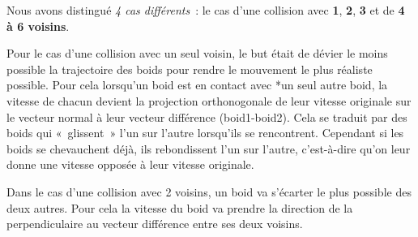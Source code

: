 \documentclass[
]{article}
\begin{document}
Nous avons distingué \emph{4 cas différents}~: le cas d'une collision
avec \textbf{1}, \textbf{2}, \textbf{3} et de \textbf{4 à 6 voisins}.

Pour le cas d'une collision avec un seul voisin, le but était de dévier
le moins possible la trajectoire des boids pour rendre le mouvement le
plus réaliste possible. Pour cela lorsqu'un boid est en contact avec *un
seul autre boid, la vitesse de chacun devient la projection
orthonogonale de leur vitesse originale sur le vecteur normal à leur
vecteur différence (boid1-boid2). Cela se traduit par des boids qui
«~glissent~» l'un sur l'autre lorsqu'ils se rencontrent. Cependant si
les boids se chevauchent déjà, ils rebondissent l'un sur l'autre,
c'est-à-dire qu'on leur donne une vitesse opposée à leur vitesse
originale.

Dans le cas d'une collision avec 2 voisins, un boid va s'écarter le plus
possible des deux autres. Pour cela la vitesse du boid va prendre la
direction de la perpendiculaire au vecteur différence entre ses deux
voisins.
\end{document}
